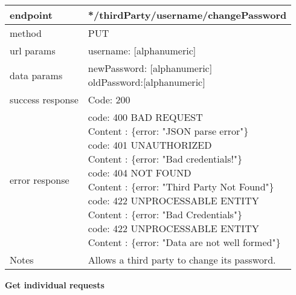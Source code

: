\begin{tabularx}{\linewidth}{| l| l }
	\hline
	endpoint & */thirdParty/{username}/changePassword \\
	\hline
	method & PUT \\
	\hline
	url params & 
	\parbox{0.7\textwidth}{
		\bigskip
		username: [alphanumeric]
		\bigskip
	}\\
	\hline
	data params & 
	\parbox{0.7\textwidth}{
		\bigskip
		newPassword: [alphanumeric]\\
		oldPassword:[alphanumeric]
		\bigskip
	} \\
	\hline
	success response &
	\parbox{0.7\textwidth}{
		\bigskip
		Code: 200
		\bigskip
	} \\
	\hline
	error response &
	\parbox{0.7\textwidth}{
		\bigskip
		code: 400 BAD REQUEST \\
		Content : \{error: "JSON parse error"\}\\
		code: 401 UNAUTHORIZED \\
		Content : \{error: "Bad credentials!"\}\\
		code: 404 NOT FOUND \\
		Content : \{error: "Third Party Not Found"\}\\
		code: 422 UNPROCESSABLE ENTITY\\
		Content : \{error: "Bad Credentials"\}\\
		code: 422 UNPROCESSABLE ENTITY\\
		Content : \{error: "Data are not well formed"\}
		\bigskip
	} \\
	\hline
	Notes & \parbox{0.7\textwidth}{
		\bigskip
		Allows a third party to change its password.
		\bigskip
	} \\
	\hline
\end{tabularx}
\newpage
\textbf{Get individual requests} \\

